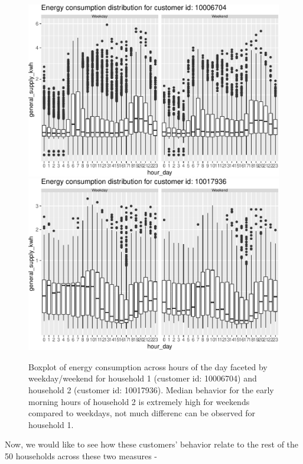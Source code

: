 \documentclass[12pt]{article}
\begin{document}
\begin{figure}

{\centering \includegraphics[width=\textwidth]{figure/bothcust-1} \includegraphics[width=\textwidth]{figure/bothcust-2} 

}

\caption{Boxplot of energy consumption across hours of the day faceted by weekday/weekend for household 1 (customer id: 10006704) and household 2 (customer id: 10017936). Median behavior for the early morning hours of household 2 is extremely high for weekends compared to weekdays, not much differenc can be observed for household 1. }\label{fig:bothcust}
\end{figure}

Now, we would like to see how these customers' behavior relate to the
rest of the 50 households across these two measures -
\end{document}
